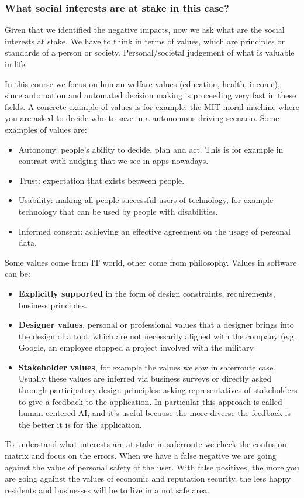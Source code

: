 \subsubsection{What social interests are at stake in this case?}
Given that we identified the negative impacts, now we ask what are the social interests at stake. We have to think in terms of values, which are principles or standards of a person or society. Personal/societal judgement of what is valuable in life.

In this course we focus on human welfare values (education, health, income), since automation and automated decision making is proceeding very fast in these fields. A concrete example of values is for example, the MIT moral machine where you are asked to decide who to save in a autonomous driving scenario.
Some examples of values are:
\begin{itemize}
    \item Autonomy: people's ability to decide, plan and act. This is for example in contrast with nudging that we see in apps nowadays.
    \item Trust: expectation that exists between people.
    \item Usability: making all people successful users of technology, for example technology that can be used by people with disabilities.
    \item Informed consent: achieving an effective agreement on the usage of personal data.
\end{itemize}
Some values come from IT world, other come from philosophy. Values in software can be: 
\begin{itemize}
    \item \textbf{Explicitly supported} in the form of design constraints, requirements, business principles.
    \item \textbf{Designer values}, personal or professional values that a designer brings into the design of a tool, which are not necessarily aligned with the company (e.g. Google, an employee stopped a project involved with the military
    \item \textbf{Stakeholder values}, for example the values we saw in saferroute case. Usually these values are inferred via business surveys or directly asked through participatory design principles: asking representatives of stakeholders to give a feedback to the application. In particular this approach is called  human centered AI, and it's useful because the more diverse the feedback is the better it is for the application.
\end{itemize}
To understand what interests are at stake in saferroute we check the confusion matrix and focus on the errors. When we have a false negative we are going against the value of personal safety of the user. With false positives, the more you are going against the values of economic and reputation security, the less happy residents and businesses will be to live in a not safe area. 
